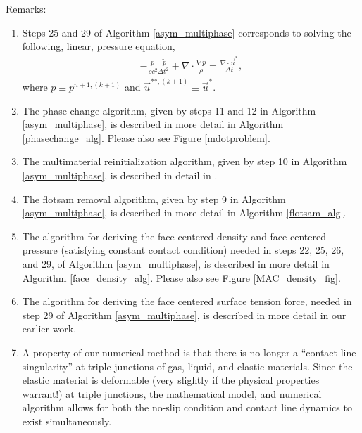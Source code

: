 \documentclass[]{article}
\begin{document}
Remarks:
\begin{enumerate}
\item Steps 25 and 29 of Algorithm \ref{asym_multiphase} corresponds to solving
  the following, linear, pressure equation,
  \begin{eqnarray}
  -\frac{p-\tilde{p}}{\rho c^{2}\Delta t^{2}}+\nabla\cdot\frac{\nabla p}{\rho}=
   \frac{\nabla\cdot\vec{u}^{\ast}}{\Delta t},
   \label{pressure_equation}
  \end{eqnarray}
  where $p\equiv p^{n+1,(k+1)}$ and 
  $\vec{u}^{\ast\ast,(k+1)}\equiv \vec{u}^{\ast}$.
\item The phase change 
    algorithm\cite{VAHAB2021,vahab2016adaptive,ye2024improved}, 
    given by steps 11 and 12 in 
    Algorithm \ref{asym_multiphase}, is described in more detail 
    in Algorithm \ref{phasechange_alg}.  
    Please also see Figure \ref{mdotproblem}.
\item The multimaterial reinitialization algorithm, given by step 10 in
  Algorithm \ref{asym_multiphase}, is described in detail in
  \cite{ye2024improved}.
\item The flotsam removal algorithm, given by step 9 in
  Algorithm \ref{asym_multiphase}, is described in more detail in
  Algorithm \ref{flotsam_alg}.
\item The algorithm for deriving the face centered density and face
  centered pressure (satisfying 
  constant contact condition\cite{kwatra2009method})
  needed in steps
  22, 25, 26, and 29, of Algorithm \ref{asym_multiphase}, is described in more 
  detail in Algorithm \ref{face_density_alg}.  Please also see Figure
  \ref{MAC_density_fig}.  
\item The algorithm for deriving the face centered
 surface tension force,
 needed in step 29 of Algorithm \ref{asym_multiphase},
 is described in more detail in our earlier 
 work\cite{li2015multiphase}.
\item A property of our numerical method is that there is no longer a 
  ``contact line singularity''\cite{ZENG2025114259,afkhami2009mesh} 
  at triple junctions of gas, liquid, and
  elastic materials.  Since the elastic material is 
  deformable 
  (very slightly if the physical properties warrant!) 
  at
  triple junctions, the mathematical model, and numerical
  algorithm allows for both the no-slip condition and 
  contact line dynamics to exist simultaneously.
\end{enumerate}
\end{document}
